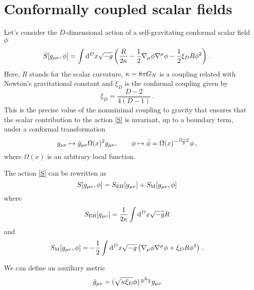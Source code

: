 \section{Conformally coupled scalar fields}
Let's consider the $D$-dimensional action of a self-gravitating conformal scalar field $\phi$
\begin{equation}\label{S}
  S[g_{\mu\nu },\phi ]=\int\dd^Dx\sqrt{-g}\left(\frac{R}{2\kappa}-\frac{1}{2}\nabla_\mu\phi\nabla^\mu\phi -\frac{1}{2}\xi_D R\phi^2\right)\,.
\end{equation}
Here, $R$ stands for the scalar curvature, $\kappa=8\pi G_N$ is a coupling related with Newton's gravitational constant and $\xi_D$ is the conformal coupling given by
\begin{equation}
  \xi_D=\frac{D-2}{4(D-1)}\,.
\end{equation}
This is the precise value of the nonminimal coupling to gravity that ensures that the scalar contribution to the action \eqref{S} is invariant, up to a boundary term, under a conformal transformation
\begin{equation}
  g_{\mu\nu } \mapsto\tilde{g}_{\mu\nu }\Omega(x)^2 g_{\mu\nu },\qquad \phi\mapsto\bar{\phi }=\Omega(x)^{-\frac{D-2}{2}}\phi \,,
\end{equation}
where $\Omega(x)$ is an arbitrary local function.

The action \eqref{S} can be rewritten as 
\begin{equation}
  S[g_{\mu\nu },\phi ]=S_{\rm EH}[g_{\mu\nu }]+S_{\rm M}[g_{\mu\nu },\phi ]
\end{equation}
where
\begin{equation}
  S_{\rm EH}[g_{\mu\nu }]=\frac{1}{2\kappa}\int\dd^D x\sqrt{-g}R
\end{equation}
and 
\begin{equation}
  S_{\rm M}[g_{\mu\nu },\phi ]=-\frac{1}{2}\int\dd^Dx\sqrt{-g}\left(\nabla_\mu\phi\nabla^\mu\phi +\xi_D R\phi^2\right)\, .
\end{equation}

We can define an auxiliary metric 
\begin{equation}
  \tilde{g}_{\mu\nu }=(\sqrt{\kappa\xi_D}\phi )^{\frac{4}{D-2}}g_{\mu\nu }
\end{equation}





 